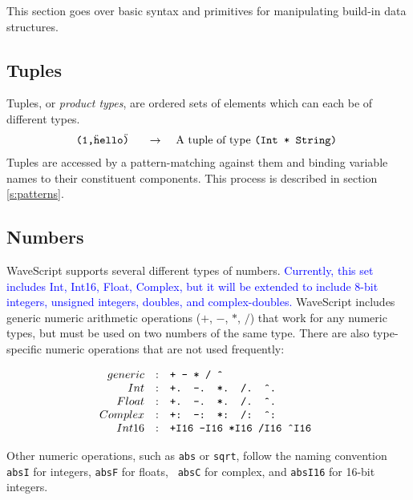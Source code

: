 \documentclass[twocolumn]{report}
\newcommand{\rednote}[1]{{\textcolor{blue}{#1}}}
\newcommand{\evalsto}[2]{\[ \begin{array}{rcl}
$\tt #1 $&$ \arr $&$ #2 $
\end{array} \]}
\newcommand{\arr}{\ensuremath{\rightarrow}}
\newenvironment{wscode}{\begin{center}\tt}{\end{center}}
\begin{document}
This section goes over basic syntax and primitives for manipulating
build-in data structures.

\subsection{Tuples}

Tuples, or {\em product types}, are ordered sets of elements which can
each be of different types. 
\evalsto{(1,\"hello\")}{A tuple of type {\tt (Int * String)}}
Tuples are accessed by a pattern-matching against them and binding
variable names to their constituent components.  This process is
described in section \ref{s:patterns}.

\subsection{Numbers}

WaveScript supports several different types of numbers.  \rednote{Currently,
this set includes Int, Int16, Float, Complex, but it will be extended
to include 8-bit integers, unsigned integers, doubles, and complex-doubles.}
WaveScript includes generic numeric arithmetic operations ($+$, $-$,
$*$, $/$) that work for any numeric types, but must be used on two
numbers of the same type.  There are also type-specific numeric
operations that are not used frequently:

\[
\begin{array}{rcl}
generic          & : & $\tt + - * / \^{}$   \\
Int              & : & $\tt +. -. *. /. \^{}. $ \\
Float            & : & $\tt +. -. *. /. \^{}. $ \\
Complex          & : & $\tt +: -: *: /: \^{}: $ \\
Int16            & : & $\tt +I16 -I16 *I16 /I16 \^{}I16 $   \\
\end{array}
\]

Other numeric operations, such as {\tt abs} or {\tt sqrt}, follow the
naming convention {\tt absI} for integers, {\tt absF} for floats, {\tt
absC} for complex, and {\tt absI16} for 16-bit integers.


\end{document}
